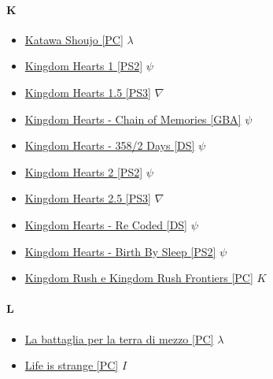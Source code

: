 		\paragraph{K} \hypertarget{GK}{}
			\begin{itemize}
				\item \href{https://mega.nz/#!57QDnSjC!tMjjShalUlS_w12xlMXaCLJE-NDndmM1P7y805d8pzA} {Katawa Shoujo [PC]} $\lambda$ \\ 
				\item \href{https://mega.nz/#!DpE1RTAS!rs6-oICXXgoKBp7bQndJGlAeJCSLP5SR224nElKsmsY} {Kingdom Hearts 1 [PS2]} $\psi$ \\ 
				\item \href{https://mega.nz/#!ebAkWQhT!eeW2c-tPx87WqqddkyNmWGD3BhkCUrsSi2GO9OtpBK4} {Kingdom Hearts 1.5 [PS3]} $\nabla$ \\ 
				\item \href{https://mega.nz/#!yt8xhaDK!hicaXF7sx71rGMUH2p7zEcnmz5sQP4kb5Y_4AWC3upI} {Kingdom Hearts - Chain of Memories [GBA]} $\psi$ \\ 
				\item \href{https://mega.nz/#!f41BDZjI!B85_tMCWvHK98lLXrsFhyR5R-UH55tg2j-sIRlpFbDs} {Kingdom Hearts - 358/2 Days [DS]} $\psi$ \\ 
				\item \href{https://mega.nz/#F!O4lw3SRB!4tD10BHD9xF2WHlptP3X_g} {Kingdom Hearts 2 [PS2]} $\psi$ \\ 
				\item \href{https://mega.nz/#!uSQyjIaa!-SJCEEgurKNGfwP-GhUIdCnCTALmq76KiFXd61AL1LU} {Kingdom Hearts 2.5 [PS3]} $\nabla$ \\
				\item \href{https://mega.nz/#!jl8Q1JxI!EjPdAYxv0xdLG0PCDp-54HFieFZH0jgC0ZT3m-a8VSM} {Kingdom Hearts - Re Coded [DS]} $\psi$ \\ 
				\item \href{https://mega.nz/#!T19gAJKJ!j8nI-4WbREtMjkIomW_5iYXsNAB7wtTph6oZtzCqCSo} {Kingdom Hearts - Birth By Sleep [PS2]} $\psi$ \\ 
				\item \href{https://mega.nz/#F!qwkFHIxI!yylgTngbLjUXxWBZe3KuUA} {Kingdom Rush e Kingdom Rush Frontiers [PC]} $K$ \\ 
		
			\end{itemize}
		
		\paragraph{L} \hypertarget{GL}{}
			\begin{itemize}
				\item \href{https://mega.nz/#!JqpGAIgT!ZfRVnVnnnEs6Ncj0jhNbdcbmTsdaTRLPq-dvWCtPj50} {La battaglia per la terra di mezzo [PC]} $\lambda$ \\ 
				\item \href{https://mega.nz/#F!exd0UKCD!AkmnZMq5__axbNNtKHwf5g} {Life is strange [PC]} $I$ \\ 
			
			
		\end{itemize}
	
